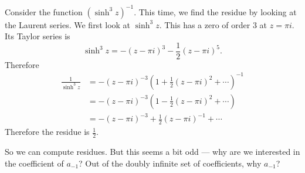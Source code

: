 \documentclass[a4paper]{article}
\begin{document}
\begin{eg}
  Consider the function $(\sinh^3 z)^{-1}$. This time, we find the residue by looking at the Laurent series. We first look at $\sinh^3 z$. This has a zero of order $3$ at $z = \pi i$. Its Taylor series is
  \[
    \sinh^3 z = -(z - \pi i)^3 - \frac{1}{2}(z - \pi i)^5.
  \]
  Therefore
  \begin{align*}
    \frac{1}{\sinh^3 z} &= -(z - \pi i)^{-3} \left(1 + \frac{1}{2}(z - \pi i)^2 + \cdots\right)^{-1}\\
    &= -(z - \pi i)^{-3}\left(1 - \frac{1}{2}(z - \pi i)^2 + \cdots\right)\\
    &= -(z - \pi i)^{-3} + \frac{1}{2}(z - \pi i)^{-1} + \cdots
  \end{align*}
  Therefore the residue is $\frac{1}{2}$.
\end{eg}
So we can compute residues. But this seems a bit odd --- why are we interested in the coefficient of $a_{-1}$? Out of the doubly infinite set of coefficients, why $a_{-1}$?
\end{document}
